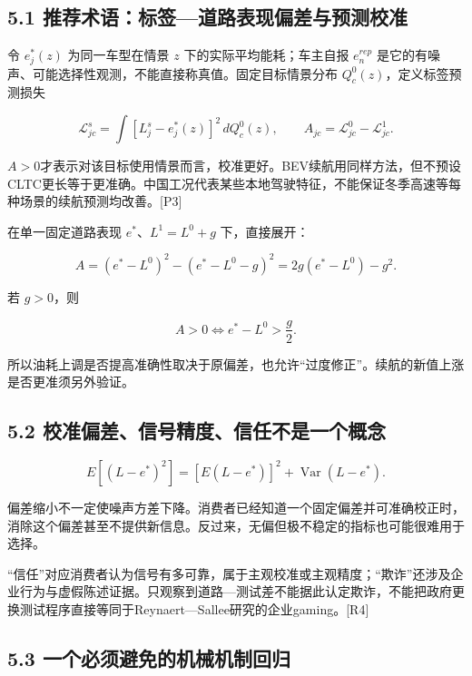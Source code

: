 \documentclass[
  11pt,
]{article}
\begin{document}
\subsection{5.1
推荐术语：标签---道路表现偏差与预测校准}\label{ux63a8ux8350ux672fux8bedux6807ux7b7eux9053ux8defux8868ux73b0ux504fux5deeux4e0eux9884ux6d4bux6821ux51c6}

令 \(e_j^*(z)\) 为同一车型在情景 \(z\) 下的实际平均能耗；车主自报
\(e_n^{rep}\)
是它的有噪声、可能选择性观测，不能直接称真值。固定目标情景分布
\(Q_c^0(z)\)，定义标签预测损失

\[
\mathcal L_{jc}^{s}
=\int [L_j^{s}-e_j^*(z)]^2\,dQ_c^0(z),
\qquad
A_{jc}=\mathcal L_{jc}^{0}-\mathcal L_{jc}^{1}. \tag{9}
\]

\(A>0\)才表示对该目标使用情景而言，校准更好。BEV续航用同样方法，但不预设CLTC更长等于更准确。中国工况代表某些本地驾驶特征，不能保证冬季高速等每种场景的续航预测均改善。{[}P3{]}

在单一固定道路表现 \(e^*\)、\(L^1=L^0+g\) 下，直接展开：

\[
A=(e^*-L^0)^2-(e^*-L^0-g)^2
=2g(e^*-L^0)-g^2. \tag{10}
\]

若 \(g>0\)，则

\[
A>0\iff e^*-L^0>\frac g2. \tag{11}
\]

所以油耗上调是否提高准确性取决于原偏差，也允许``过度修正''。续航的新值上涨是否更准须另外验证。

\subsection{5.2
校准偏差、信号精度、信任不是一个概念}\label{ux6821ux51c6ux504fux5deeux4fe1ux53f7ux7cbeux5ea6ux4fe1ux4efbux4e0dux662fux4e00ux4e2aux6982ux5ff5}

\[
E[(L-e^*)^2]=[E(L-e^*)]^2+\operatorname{Var}(L-e^*). \tag{12}
\]

偏差缩小不一定使噪声方差下降。消费者已经知道一个固定偏差并可准确校正时，消除这个偏差甚至不提供新信息。反过来，无偏但极不稳定的指标也可能很难用于选择。

``信任''对应消费者认为信号有多可靠，属于主观校准或主观精度；``欺诈''还涉及企业行为与虚假陈述证据。只观察到道路---测试差不能据此认定欺诈，不能把政府更换测试程序直接等同于Reynaert---Sallee研究的企业gaming。{[}R4{]}

\subsection{5.3
一个必须避免的机械机制回归}\label{ux4e00ux4e2aux5fc5ux987bux907fux514dux7684ux673aux68b0ux673aux5236ux56deux5f52}
\end{document}
